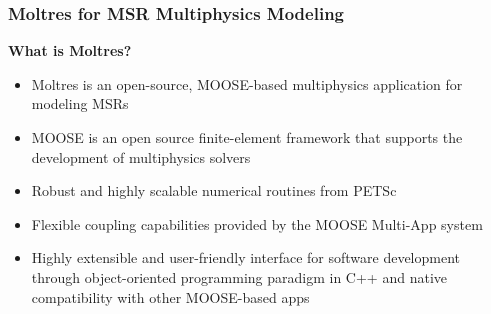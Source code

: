 \begin{frame}
  \frametitle{Moltres for MSR Multiphysics Modeling}
  \textbf{What is Moltres?}
  \begin{itemize}
    \item Moltres \cite{lindsay_introduction_2018} is an open-source, MOOSE-based
      multiphysics application for modeling MSRs
	\item \gls{MOOSE} \cite{lindsay_20_2022} is an open source finite-element framework
      that supports the development of multiphysics solvers
    \item Robust and highly scalable numerical routines from PETSc
    \item Flexible coupling capabilities provided by the MOOSE Multi-App system
    \item Highly extensible and user-friendly interface for software development through
      object-oriented programming paradigm in C++ and native compatibility with other MOOSE-based
      apps
  \end{itemize}
\end{frame}

